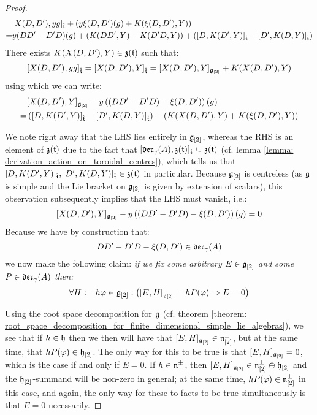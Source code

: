 \begin{proof}
                    $$
                        \begin{aligned}
                            & [ X(D, D') , y g ]_{\hat{\mathfrak{t}}} + \left( y \xi(D, D')(g) + K(\xi(D, D'), Y) \right)
                            \\
                            = & y (DD' - D'D)( g ) + ( K(DD', Y) - K(D'D, Y) ) + ( [ D, K(D', Y) ]_{\hat{\mathfrak{t}}} - [ D', K(D, Y) ]_{\hat{\mathfrak{t}}} )
                        \end{aligned}
                    $$
                There exists $K( X(D, D'), Y ) \in \mathfrak{z}(\mathfrak{t})$ such that:
                    $$[ X(D, D') , y g ]_{\hat{\mathfrak{t}}} = [ X(D, D') , Y ]_{\hat{\mathfrak{t}}} = [X(D, D'), Y]_{\mathfrak{g}_{[2]}} + K( X(D, D'), Y )$$
                using which we can write:
                    $$
                        \begin{aligned}
                            & [X(D, D'), Y]_{\mathfrak{g}_{[2]}} - y \left( ( DD' - D'D) - \xi(D, D') \right)( g )
                            \\
                            = & \left( [ D, K(D', Y) ]_{\hat{\mathfrak{t}}} - [ D', K(D, Y) ]_{\hat{\mathfrak{t}}} \right) - \left( K( X(D, D'), Y ) + K(\xi(D, D'), Y) \right)
                        \end{aligned}
                    $$
                    
                We note right away that the LHS lies entirely in $\mathfrak{g}_{[2]}$, whereas the RHS is an element of $\mathfrak{z}(\mathfrak{t})$ due to the fact that $[\mathfrak{der}_{\gamma}(A), \mathfrak{z}(\mathfrak{t})]_{\hat{\mathfrak{t}}} \subseteq \mathfrak{z}(\mathfrak{t})$ (cf. lemma \ref{lemma: derivation_action_on_toroidal_centres}), which tells us that $[ D, K(D', Y) ]_{\hat{\mathfrak{t}}}, [ D', K(D, Y) ]_{\hat{\mathfrak{t}}} \in \mathfrak{z}(\mathfrak{t})$ in particular. Because $\mathfrak{g}_{[2]}$ is centreless (as $\mathfrak{g}$ is simple and the Lie bracket on $\mathfrak{g}_{[2]}$ is given by extension of scalars), this observation subsequently implies that the LHS must vanish, i.e.:
                    $$[X(D, D'), Y]_{\mathfrak{g}_{[2]}} - y \left( ( DD' - D'D) - \xi(D, D') \right)( g ) = 0$$
                Because we have by construction that:
                    $$DD' - D'D - \xi(D, D') \in \mathfrak{der}_{\gamma}(A)$$
                we now make the following claim: \textit{if we fix some arbitrary $E \in \mathfrak{g}_{[2]}$ and some $P \in \mathfrak{der}_{\gamma}(A)$ then:}
                    $$\forall H := h \varphi \in \mathfrak{g}_{[2]}: \left( [E, H]_{\mathfrak{g}_{[2]}} = h P( \varphi ) \Rightarrow E = 0 \right)$$

                Using the root space decomposition for $\mathfrak{g}$ (cf. theorem \ref{theorem: root_space_decomposition_for_finite_dimensional_simple_lie_algebras}), we see that if $h \in \mathfrak{h}$ then we then will have that $[E, H]_{\mathfrak{g}_{[2]}} \in \mathfrak{n}^{\pm}_{[2]}$, but at the same time, that $h P(\varphi) \in \mathfrak{h}_{[2]}$. The only way for this to be true is that $[E, H]_{\mathfrak{g}_{[2]}} = 0$, which is the case if and only if $E = 0$. If $h \in \mathfrak{n}^{\pm}$, then $[E, H]_{\mathfrak{g}_{[2]}} \in \mathfrak{n}^{\pm}_{[2]} \oplus \mathfrak{h}_{[2]}$ and the $\mathfrak{h}_{[2]}$-summand will be non-zero in general; at the same time, $h P(\varphi) \in \mathfrak{n}^{\pm}_{[2]}$ in this case, and again, the only way for these to facts to be true simultaneously is that $E = 0$ necessarily. 


\end{proof}
